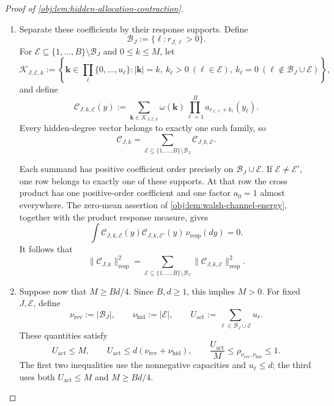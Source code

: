 \documentclass[11pt]{article}
\begin{document}
\begin{proof}[Proof of \cref{obj:lem:hidden-allocation-contraction}]
\begin{enumerate}
For a square-integrable function
\(\varpi:\mathbb R^B\to\mathbb R\), write
\[
\|\varpi\|_{\mathrm{resp}}^2
:=
\int_{\mathbb R^B}\varpi(y)^2\,\nu_{\mathrm{resp}}(dy).
\]
The zero-degree coefficient is
\[
\mathcal C_{\varnothing,0}(y)=\prod_{\ell=1}^B a_0(y_\ell)=1
\quad\text{for }\nu_{\mathrm{resp}}\text{-almost every }y.
\]
Subtracting this coefficient, applying sign orthogonality, and integrating over \(y\) proves the exact labeled-energy identity
\[
\chi_H^2
=
\sum_{\substack{
J\subseteq\bigcup_\ell R_\ell,\ 0\le k\le M\\
(J,k)\ne(\varnothing,0)}}
\frac{\|\mathcal C_{J,k}\|_{\mathrm{resp}}^2}{\binom Mk}.
\]

\item Separate these coefficients by their response supports. Define
\[
\mathcal B_J:=\{\ell:r_{J,\ell}>0\}.
\]
For \(\mathcal E\subseteq\{1,\ldots,B\}\setminus\mathcal B_J\) and
\(0\le k\le M\), let
\[
\mathscr K_{J,\mathcal E,k}
:=
\left\{
\boldsymbol k\in\prod_\ell\{0,\ldots,u_\ell\}:
|\boldsymbol k|=k,\
k_\ell>0\ (\ell\in\mathcal E),\
k_\ell=0\ (\ell\notin\mathcal B_J\cup\mathcal E)
\right\},
\]
and define
\[
\mathcal C_{J,k,\mathcal E}(y)
:=
\sum_{\boldsymbol k\in\mathscr K_{J,\mathcal E,k}}
\omega(\boldsymbol k)
\prod_{\ell=1}^B a_{r_{J,\ell}+k_\ell}(y_\ell).
\]
Every hidden-degree vector belongs to exactly one such family, so
\[
\mathcal C_{J,k}
=
\sum_{\mathcal E\subseteq\{1,\ldots,B\}\setminus\mathcal B_J}
\mathcal C_{J,k,\mathcal E}.
\]

Each summand has positive coefficient order precisely on
\(\mathcal B_J\cup\mathcal E\). If \(\mathcal E\ne\mathcal E'\), one row belongs to exactly one of these supports. At that row the cross product has one positive-order coefficient and one factor \(a_0=1\) almost everywhere. The zero-mean assertion of
\cref{obj:lem:walsh-channel-energy}, together with the product response measure, gives
\[
\int
\mathcal C_{J,k,\mathcal E}(y)
\mathcal C_{J,k,\mathcal E'}(y)\,
\nu_{\mathrm{resp}}(dy)=0.
\]
It follows that
\[
\|\mathcal C_{J,k}\|_{\mathrm{resp}}^2
=
\sum_{\mathcal E\subseteq\{1,\ldots,B\}\setminus\mathcal B_J}
\|\mathcal C_{J,k,\mathcal E}\|_{\mathrm{resp}}^2.
\]

\item Suppose now that \(M\ge Bd/4\). Since \(B,d\ge1\), this implies \(M>0\).
For fixed \(J,\mathcal E\), define
\[
\nu_{\mathrm{rev}}:=|\mathcal B_J|,
\qquad
\nu_{\mathrm{hid}}:=|\mathcal E|,
\qquad
U_{\mathrm{act}}:=\sum_{\ell\in\mathcal B_J\cup\mathcal E}u_\ell.
\]
These quantities satisfy
\[
U_{\mathrm{act}}\le M,
\qquad
U_{\mathrm{act}}\le d(\nu_{\mathrm{rev}}+\nu_{\mathrm{hid}}),
\qquad
\frac{U_{\mathrm{act}}}{M}
\le\rho_{\nu_{\mathrm{rev}},\nu_{\mathrm{hid}}}\le1.
\]
The first two inequalities use the nonnegative capacities and \(u_\ell\le d\); the third uses both \(U_{\mathrm{act}}\le M\) and \(M\ge Bd/4\).


\end{enumerate}
\end{proof}
\end{document}
